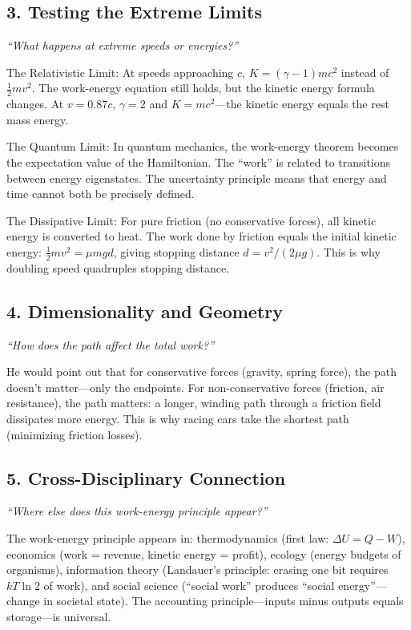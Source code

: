 \subsection*{3. Testing the Extreme Limits}
\textit{``What happens at extreme speeds or energies?''}

The Relativistic Limit: At speeds approaching $c$, $K = (\gamma - 1)mc^2$ instead of $\frac{1}{2}mv^2$. The work-energy equation still holds, but the kinetic energy formula changes. At $v = 0.87c$, $\gamma = 2$ and $K = mc^2$---the kinetic energy equals the rest mass energy.

The Quantum Limit: In quantum mechanics, the work-energy theorem becomes the expectation value of the Hamiltonian. The ``work'' is related to transitions between energy eigenstates. The uncertainty principle means that energy and time cannot both be precisely defined.

The Dissipative Limit: For pure friction (no conservative forces), all kinetic energy is converted to heat. The work done by friction equals the initial kinetic energy: $\frac{1}{2}mv^2 = \mu mgd$, giving stopping distance $d = v^2/(2\mu g)$. This is why doubling speed quadruples stopping distance.

\subsection*{4. Dimensionality and Geometry}
\textit{``How does the path affect the total work?''}

He would point out that for conservative forces (gravity, spring force), the path doesn't matter---only the endpoints. For non-conservative forces (friction, air resistance), the path matters: a longer, winding path through a friction field dissipates more energy. This is why racing cars take the shortest path (minimizing friction losses).

\subsection*{5. Cross-Disciplinary Connection}
\textit{``Where else does this work-energy principle appear?''}

The work-energy principle appears in: thermodynamics (first law: $\Delta U = Q - W$), economics (work = revenue, kinetic energy = profit), ecology (energy budgets of organisms), information theory (Landauer's principle: erasing one bit requires $kT \ln 2$ of work), and social science (``social work'' produces ``social energy''---change in societal state). The accounting principle---inputs minus outputs equals storage---is universal.
